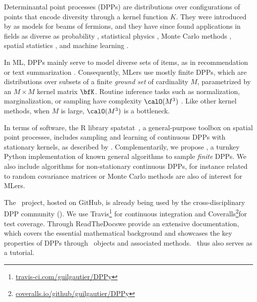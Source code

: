 \documentclass[twoside,11pt]{article}
\begin{document}
    Determinantal point processes (DPPs) are distributions over configurations of points that encode diversity through a kernel function $K$.
    They were introduced by \citet{Mac75} as models for beams of fermions, and they have since found applications in fields as diverse as probability \citep{Sos00, Kon05, HKPV06}, statistical physics \citep{PaBe11}, Monte Carlo methods \citep{BaHa16}, spatial statistics \citep{LaMoRu15}, and machine learning \citep[ML,][]{KuTa12}.

    In ML, DPPs mainly serve to model diverse sets of items, as in recommendation \citep{KaDeKo16, GaPaKo16} or text summarization \citep{DuBa18}.
    Consequently, MLers  use mostly finite DPPs, which are distributions over subsets of a finite \emph{ground set} of cardinality $M$, parametrized by an $M\times M$ kernel matrix $\bfK$.
    Routine inference tasks such as normalization, marginalization, or sampling have complexity $\calO(M^3)$ \citep{Gil14}.
    Like other kernel methods, when $M$ is large, $\calO(M^3)$ is a bottleneck.

    In terms of software, the R library \textsf{spatstat}\ \citep{BaTu05}, a general-purpose toolbox on spatial point processes, includes sampling and learning of continuous DPPs with stationary kernels, as described by \citet{LaMoRu15}.
    Complementarily, we propose \DPPy, a turnkey Python implementation of known general algorithms to sample \emph{finite} DPPs.
    We also include algorithms for non-stationary continuous DPPs, for instance related to random covariance matrices or Monte Carlo methods are also of interest for MLers.

    The \DPPy\ project, hosted on GitHub,\! is already being used by the cross-disciplinary DPP community (\citealp{BuRaWi19,Kam18,Pou19,DeCaVa19,GaBaVa19}).
    We use \setcounter{footnote}{5}Travis\!\footnote{\href{https://travis-ci.com/guilgautier/DPPy}{\textsf{travis-ci.com/guilgautier/DPPy}}} for continuous integration and Coveralls\!\footnote{\href{https://coveralls.io/github/guilgautier/DPPy}{\textsf{coveralls.io/github/guilgautier/DPPy}}}for test coverage.
    Through ReadTheDocs\hspace{1pt}we provide an extensive documentation, which covers the essential mathematical background and showcases the key properties of DPPs through \DPPy\ objects and associated methods.
    \DPPy\ thus also serves as a tutorial.
\end{document}
